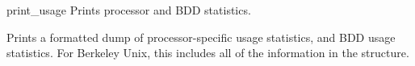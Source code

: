 \begin{nusmvCommand}{print\_usage} {Prints processor and BDD statistics.}
 

Prints a formatted dump of processor-specific usage statistics, and
BDD usage statistics. For Berkeley Unix, this includes all of the
information in the   structure.

\end{nusmvCommand}
